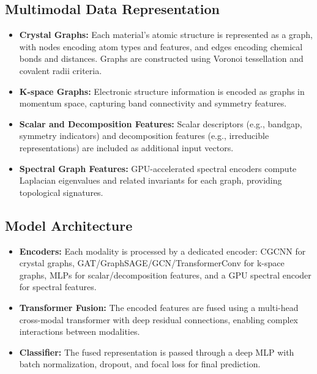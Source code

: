 \documentclass[12pt]{article}
\begin{document}
\subsection{Multimodal Data Representation}
\begin{itemize}
    \item \textbf{Crystal Graphs:} Each material's atomic structure is represented as a graph, with nodes encoding atom types and features, and edges encoding chemical bonds and distances. Graphs are constructed using Voronoi tessellation and covalent radii criteria.
    \item \textbf{K-space Graphs:} Electronic structure information is encoded as graphs in momentum space, capturing band connectivity and symmetry features.
    \item \textbf{Scalar and Decomposition Features:} Scalar descriptors (e.g., bandgap, symmetry indicators) and decomposition features (e.g., irreducible representations) are included as additional input vectors.
    \item \textbf{Spectral Graph Features:} GPU-accelerated spectral encoders compute Laplacian eigenvalues and related invariants for each graph, providing topological signatures.
\end{itemize}

\subsection{Model Architecture}
\begin{itemize}
    \item \textbf{Encoders:} Each modality is processed by a dedicated encoder: CGCNN for crystal graphs, GAT/GraphSAGE/GCN/TransformerConv for k-space graphs, MLPs for scalar/decomposition features, and a GPU spectral encoder for spectral features.
    \item \textbf{Transformer Fusion:} The encoded features are fused using a multi-head cross-modal transformer with deep residual connections, enabling complex interactions between modalities.
    \item \textbf{Classifier:} The fused representation is passed through a deep MLP with batch normalization, dropout, and focal loss for final prediction.
\end{itemize}
\end{document}
